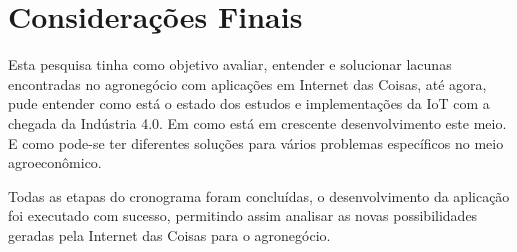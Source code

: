 \documentclass[eso]{bcc}
\begin{document}
\chapter{Considerações Finais}\label{chap:consideracoes}

\avisoPIC{}

Esta pesquisa tinha como objetivo avaliar, entender e solucionar lacunas encontradas 
no agronegócio com aplicações em Internet das Coisas, até agora, pude entender como está 
o estado dos estudos e implementações da IoT com a chegada da Indústria 4.0. Em como está 
em crescente desenvolvimento este meio. E como pode-se ter diferentes soluções para vários 
problemas específicos no meio agroeconômico.

Todas as etapas do cronograma foram concluídas, o desenvolvimento da aplicação foi executado 
com sucesso, permitindo assim analisar as novas possibilidades geradas pela Internet das Coisas 
para o agronegócio.


\nocite{*} %



\end{document}
